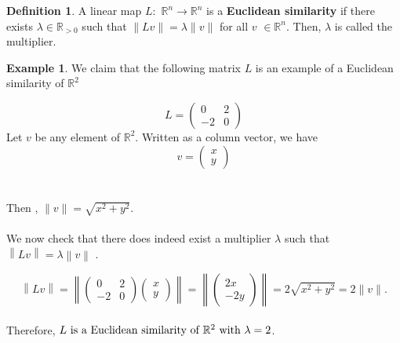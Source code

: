 \documentclass[11pt]{report}
\theoremstyle{plain}
\theoremstyle{definition}
\newtheorem{defn}{Definition}
\newtheorem{exmp}{Example} %
\begin{document}
\begin{defn}
	A linear map $ L: $   $\mathbb{R}^n  \rightarrow  \mathbb{R}^n$ is a \textbf{Euclidean similarity} if there exists $\lambda \in  \mathbb{R}_{>0} $ such that  $ \|Lv\|
	= \lambda \|v\| $ for all $ v $ $ \in  \mathbb{R}^n. $ Then, $ \lambda $	is called the multiplier.
\end{defn}
 \begin{exmp}
 	We claim that the following matrix $ L $ is an example of a Euclidean similarity of $ \mathbb{R}^2 $
 \end{exmp}
 $$ 
L=
\begin{pmatrix}
0 & 2\\
-2 & 0
\end{pmatrix}$$
Let $ v  $
 be any element of $ \mathbb{R}^2. $ Written as a column vector, we have
$$ v =  \begin{pmatrix}
x\\
y
\end{pmatrix} $$
\ \\ \\
Then , $ \|v\| = \sqrt{x^2 + y^2} $.\\ \\ We now check that there does indeed exist a multiplier $ \lambda $ such that $ \left\| Lv\right\| =\lambda\left\| v\right\| $ . \vspace{4mm}

$$ \left\| Lv\right\|   =  \left\| \begin{pmatrix}
0 & 2\\
-2 & 0
\end{pmatrix}  \begin{pmatrix}
x\\
y
\end{pmatrix} \right\|   = \left\| \begin{pmatrix}
2x\\
-2y
\end{pmatrix}\right\|  =   2 \sqrt{x^2+y^2} =  2 \|v\|. $$ \vspace{4mm}\\		
  Therefore, $\text{$ L $ is a Euclidean similarity of $ \mathbb{R}^2 $ with }  \lambda = 2 $. \\
\end{document}
